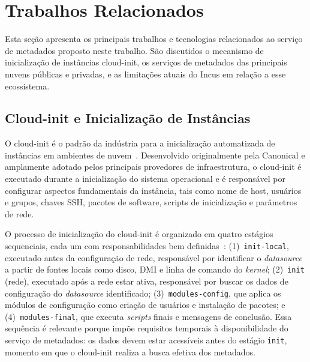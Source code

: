 \section{Trabalhos Relacionados}
\label{sec_relacionados}

Esta seção apresenta os principais trabalhos e tecnologias relacionados ao serviço de metadados proposto neste trabalho. São discutidos o mecanismo de inicialização de instâncias cloud-init, os serviços de metadados das principais nuvens públicas e privadas, e as limitações atuais do Incus em relação a esse ecossistema.

\subsection{Cloud-init e Inicialização de Instâncias}

O cloud-init é o padrão da indústria para a inicialização automatizada de instâncias em ambientes de nuvem~\citep{cloudinit2024}. Desenvolvido originalmente pela Canonical e amplamente adotado pelos principais provedores de infraestrutura, o cloud-init é executado durante a inicialização do sistema operacional e é responsável por configurar aspectos fundamentais da instância, tais como nome de host, usuários e grupos, chaves SSH, pacotes de software, scripts de inicialização e parâmetros de rede.

O processo de inicialização do cloud-init é organizado em quatro estágios sequenciais, cada um com responsabilidades bem definidas~\citep{cloudinit2024}: (1)~\texttt{init-local}, executado antes da configuração de rede, responsável por identificar o \textit{datasource} a partir de fontes locais como disco, DMI e linha de comando do \textit{kernel}; (2)~\texttt{init} (rede), executado após a rede estar ativa, responsável por buscar os dados de configuração do \textit{datasource} identificado; (3)~\texttt{modules-config}, que aplica os módulos de configuração como criação de usuários e instalação de pacotes; e (4)~\texttt{modules-final}, que executa \textit{scripts} finais e mensagens de conclusão. Essa sequência é relevante porque impõe requisitos temporais à disponibilidade do serviço de metadados: os dados devem estar acessíveis antes do estágio \texttt{init}, momento em que o cloud-init realiza a busca efetiva dos metadados.

